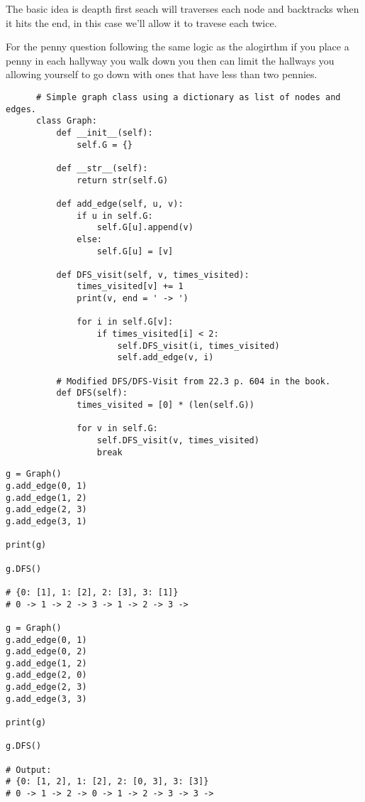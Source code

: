 \documentclass{article}
\begin{document}
\begin{enumerate}
    The basic idea is deapth first seach will traverses each node and backtracks when it hits the end, in this case we'll allow it to travese each twice.

    For the penny question following the same logic as the alogirthm if you place a penny in each hallyway you walk down you then can limit the hallways you allowing yourself to go down with ones that have less than two pennies.

    \begin{lstlisting}
      # Simple graph class using a dictionary as list of nodes and edges.
      class Graph:   
          def __init__(self): 
              self.G = {}
              
          def __str__(self):
              return str(self.G)
        
          def add_edge(self, u, v): 
              if u in self.G:
                  self.G[u].append(v) 
              else:
                  self.G[u] = [v]
        
          def DFS_visit(self, v, times_visited): 
              times_visited[v] += 1
              print(v, end = ' -> ') 
              
              for i in self.G[v]: 
                  if times_visited[i] < 2:  
                      self.DFS_visit(i, times_visited)
                      self.add_edge(v, i)
          
          # Modified DFS/DFS-Visit from 22.3 p. 604 in the book.
          def DFS(self): 
              times_visited = [0] * (len(self.G)) 
              
              for v in self.G:
                  self.DFS_visit(v, times_visited)
                  break      
    \end{lstlisting}

    \begin{lstlisting}
g = Graph() 
g.add_edge(0, 1) 
g.add_edge(1, 2) 
g.add_edge(2, 3) 
g.add_edge(3, 1) 

print(g)

g.DFS()

# {0: [1], 1: [2], 2: [3], 3: [1]}
# 0 -> 1 -> 2 -> 3 -> 1 -> 2 -> 3 -> 

g = Graph() 
g.add_edge(0, 1) 
g.add_edge(0, 2) 
g.add_edge(1, 2) 
g.add_edge(2, 0) 
g.add_edge(2, 3) 
g.add_edge(3, 3) 

print(g)

g.DFS()      

# Output:
# {0: [1, 2], 1: [2], 2: [0, 3], 3: [3]}
# 0 -> 1 -> 2 -> 0 -> 1 -> 2 -> 3 -> 3 ->
    \end{lstlisting}


\end{enumerate}
\end{document}
